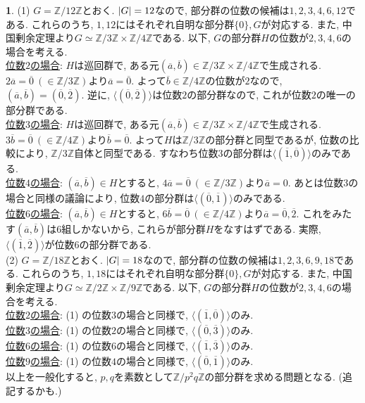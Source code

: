 \documentclass{article}
\theoremstyle{definition}
\newtheorem{ans}{}
\numberwithin{ans}{subsection}
\newcommand{\Z}[1]{\mathbb{Z}/#1\mathbb{Z}}
\DeclarePairedDelimiter{\abs}{\lvert}{\rvert}
\begin{document}
\begin{ans}
  (1) $G = \Z{12}$とおく. $\abs{G} = 12$なので, 部分群の位数の候補は$1, 2, 3, 4, 6, 12$である.
  これらのうち, $1, 12$にはそれぞれ自明な部分群$\{0\}, G$が対応する.
  また, 中国剰余定理より$G \simeq \Z{3} \times \Z{4}$である.
  以下, $G$の部分群$H$の位数が$2, 3, 4, 6$の場合を考える.\\
  \underline{位数$2$の場合}:
  $H$は巡回群で, ある元$(\overline{a}, \overline{b}) \in \Z{3} \times \Z{4}$で生成される.
  $2\overline{a} = \overline{0}\ (\in \Z{3})$より$\overline{a} = \overline{0}$.
  よって$\overline{b} \in \Z{4}$の位数が$2$なので,
  $(\overline{a}, \overline{b}) = (\overline{0}, \overline{2})$.
  逆に, $\langle (\overline{0}, \overline{2}) \rangle$は位数$2$の部分群なので,
  これが位数$2$の唯一の部分群である.\\
  \underline{位数$3$の場合}:
  $H$は巡回群で, ある元$(\overline{a}, \overline{b}) \in \Z{3} \times \Z{4}$で生成される.
  $3\overline{b} = \overline{0}\ (\in \Z{4})$より$\overline{b} = \overline{0}$.
  よって$H$は$\Z{3}$の部分群と同型であるが, 位数の比較により, $\Z{3}$自体と同型である.
  すなわち位数$3$の部分群は$\langle (\overline{1}, \overline{0}) \rangle$のみである.\\
  \underline{位数$4$の場合}:
  $(\overline{a}, \overline{b}) \in H$とすると,
  $4\overline{a} = \overline{0}\ (\in \Z{3})$より$\overline{a} = 0$.
  あとは位数$3$の場合と同様の議論により, 位数$4$の部分群は$\langle (\overline{0}, \overline{1}) \rangle$のみである.\\
  \underline{位数$6$の場合}:
  $(\overline{a}, \overline{b}) \in H$とすると,
  $6\overline{b} = \overline{0}\ (\in \Z{4})$より$\overline{a} = \overline{0}, \overline{2}$.
  これをみたす$(\overline{a}, \overline{b})$は$6$組しかないから, これらが部分群$H$をなすはずである.
  実際, $\langle (\overline{1}, \overline{2}) \rangle$が位数$6$の部分群である.\\
  (2) $G = \Z{18}$とおく. $\abs{G} = 18$なので, 部分群の位数の候補は$1, 2, 3, 6, 9, 18$である.
  これらのうち, $1, 18$にはそれぞれ自明な部分群$\{0\}, G$が対応する.
  また, 中国剰余定理より$G \simeq \Z{2} \times \Z{9}$である.
  以下, $G$の部分群$H$の位数が$2, 3, 4, 6$の場合を考える.\\
  \underline{位数$2$の場合}:
  (1) の位数$3$の場合と同様で, $\langle (\overline{1}, \overline{0}) \rangle$のみ.\\
  \underline{位数$3$の場合}:
  (1) の位数$2$の場合と同様で, $\langle (\overline{0}, \overline{3}) \rangle$のみ.\\
  \underline{位数$6$の場合}:
  (1) の位数$6$の場合と同様で, $\langle (\overline{1}, \overline{3}) \rangle$のみ.\\
  \underline{位数$9$の場合}:
  (1) の位数$4$の場合と同様で, $\langle (\overline{0}, \overline{1}) \rangle$のみ.\\
  以上を一般化すると, $p, q$を素数として$\Z{p^2q}$の部分群を求める問題となる. (追記するかも.)
\end{ans}
\end{document}
